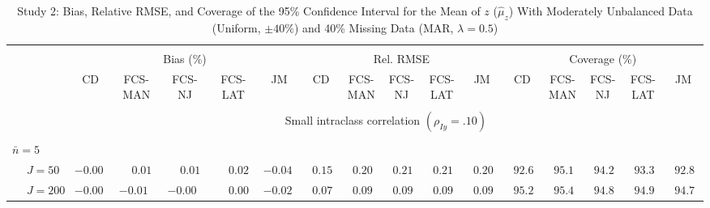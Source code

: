 \begin{sidewaystable}
\begin{threeparttable}
\setlength{\tabcolsep}{1.0pt}
\renewcommand{\arraystretch}{0.95}
\footnotesize
\caption{\small Study 2: Bias, Relative RMSE, and Coverage of the 95\% Confidence Interval for the Mean of $z$ ($\hat\mu_z$) With Moderately Unbalanced Data (Uniform, $\pm 40\%$) and 40\% Missing Data (MAR, $\lambda=0.5$)}
\begin{tabular}{llccccccccccccccc}
\hline\\[-1.8ex]
& & \multicolumn{5}{c}{Bias (\%)} & \multicolumn{5}{c}{Rel. RMSE} & \multicolumn{5}{c}{Coverage (\%)} \\ \cmidrule(r){3-7}\cmidrule(r){8-12}\cmidrule(r){13-17}
 &  & CD & \makecell{FCS-\\MAN} & \makecell{FCS-\\NJ} & \makecell{FCS-\\LAT} & JM & CD & \makecell{FCS-\\MAN} & \makecell{FCS-\\NJ} & \makecell{FCS-\\LAT} & JM & CD & \makecell{FCS-\\MAN} & \makecell{FCS-\\NJ} & \makecell{FCS-\\LAT} & \multicolumn{1}{c}{JM} \\ 
[0.4ex]\hline\\[-1.8ex]
& & \multicolumn{15}{c}{Small intraclass correlation $(\rho_{Iy}=.10)$} \\[0.6ex]\hline\\[-1.8ex]
\multicolumn{4}{l}{$\bar{n}=5$} \\  & \nopagebreak $\;J=50$  & ${-}0.00\phantom{0}$ & $\phantom{-}0.01\phantom{0}$ & $\phantom{-}0.01\phantom{0}$ & $\phantom{-}0.02\phantom{0}$ & ${-}0.04\phantom{0}$ & $\phantom{0}0.15\phantom{0}$ & $\phantom{0}0.20\phantom{0}$ & $\phantom{0}0.21\phantom{0}$ & $\phantom{0}0.21\phantom{0}$ & $\phantom{0}0.20\phantom{0}$ & $\phantom{0}92.6\phantom{0}$ & $\phantom{0}95.1\phantom{0}$ & $\phantom{0}94.2\phantom{0}$ & $\phantom{0}93.3\phantom{0}$ & $\phantom{0}92.8\phantom{0}$ \\
 & \nopagebreak $\;J=200$  & ${-}0.00\phantom{0}$ & ${-}0.01\phantom{0}$ & ${-}0.00\phantom{0}$ & $\phantom{-}0.00\phantom{0}$ & ${-}0.02\phantom{0}$ & $\phantom{0}0.07\phantom{0}$ & $\phantom{0}0.09\phantom{0}$ & $\phantom{0}0.09\phantom{0}$ & $\phantom{0}0.09\phantom{0}$ & $\phantom{0}0.09\phantom{0}$ & $\phantom{0}95.2\phantom{0}$ & $\phantom{0}95.4\phantom{0}$ & $\phantom{0}94.8\phantom{0}$ & $\phantom{0}94.9\phantom{0}$ & $\phantom{0}94.7\phantom{0}$ \\

\end{tabular}
\end{threeparttable}
\end{sidewaystable}
